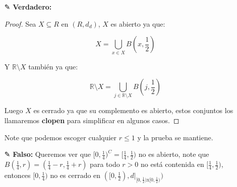 \begin{itemize}[leftmargin=*]
\begin{tikznt}

\end{tikznt}

\begin{proof}
    Para ver que los naturales son cerrados con $d_1$, veamos que su complemento es abierto. Observe que:


    $$\displaystyle \mathbb{R}\setminus\mathbb{N}=(-\infty,0)\bigcup_{i \in \mathbb{N}}B\left(i+\frac{1}{2},\frac{1}{2}\right)$$


Note que esas bolas son abiertas y unión arbitraria de abiertos es abierto, efectivamente esas bolas cubren $\mathbb{R}\setminus \mathbb{N}$ entonces acabamos.
    
\end{proof}


\item[✎]\textbf{Verdadero: } \\
\begin{proof}
    Sea $X\subseteq R$ en $(R,d_d)$, $X$ es abierto ya que:

    $$X=\bigcup_{x \in X}B\left(x,\frac{1}{2}\right)$$

    Y $\mathbb{R}\setminus X$ también ya que:

     $$\mathbb{R}\setminus X=\bigcup_{j \in \mathbb{R}\setminus X}B\left(j,\frac{1}{2}\right)$$

     Luego $X$ es cerrado ya que su complemento es abierto, estos conjuntos los llamaremos \textbf{clopen} para simplificar en algunos casos.
\end{proof}

Note que podemos escoger cualquier $r\leq 1$ y la prueba se mantiene.

\item[✎] \textbf{Falso: }Queremos ver que $[0,\frac{1}{4})^C=[\frac{1}{4},\frac{1}{2})$ no es abierto, note que $B(\frac{1}{4},r)=(\frac{1}{4}-r,\frac{1}{4}+r)$ para todo $r>0$ no está contenida en $[\frac{1}{4},\frac{1}{2})$, entonces $[0,\frac{1}{4})$ no es cerrado en $([0,\frac{1}{2}),d|_{[0,\frac{1}{2})\text{x}[0,\frac{1}{2})})$ 


\end{itemize}
